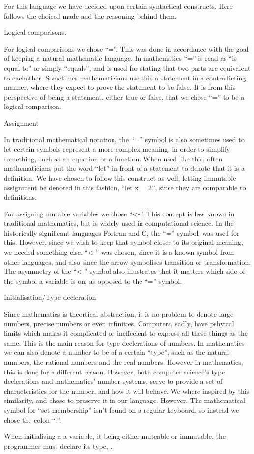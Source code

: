 For this language we have decided upon certain syntactical constructs. Here follows the choiced made and the reasoning behind them.

%

Logical comparisons.

For logical comparisons we chose \enquote{=}. This was done in accordance with the goal of keeping a natural mathematic language. In mathematics \enquote{=} is read as \enquote{is equal to} or simply \enquote{equals}, and is used for stating that two parts are equivalent to eachother. Sometimes mathematicians use this a statement in a contradicting manner, where they expect to prove the statement to be false. It is from this perspective of being a statement, either true or false, that we chose \enquote{=} to be a logical comparison.

Assignment

In traditional mathematical notation, the \enquote{=} symbol is also sometimes used to let certain symbols represent a more complex meaning, in order to simplify something, such as an equation or a function. When used like this, often mathematicians put the word \enquote{let} in front of a statement to denote that it is a definition. We have chosen to follow this construct as well, letting immutable assignment be denoted in this fashion, \enquote{let x = 2}, since they are comparable to definitions.

For assigning mutable variables we chose \enquote{<-}. This concept is less known in traditional mathematics, but is widely used in computational science. In the historically significant languages Fortran and C, the \enquote{=} symbol, was used for this. However, since we wish to keep that symbol closer to its original meaning, we needed something else. \enquote{<-} was chosen, since it is a known symbol from other languages, and also since the arrow symbolises transition or transformation. The asymmetry of the \enquote{<-} symbol also illustrates that it matters which side of the symbol a variable is on, as opposed to the \enquote{=} symbol.


Initialisation/Type decleration

Since mathematics is theortical abstraction, it is no problem to denote large numbers, precise numbers or even infinities. Computers, sadly, have pshyical limits which makes it complicated or ineffecient to express all these things as the same. This is the main reason for type declerations of numbers. In mathematics we can also denote a number to be of a certain \enquote{type}, such as the natural numbers, the rational numbers and the real numbers. However in mathematics, this is done for a different reason. However, both computer science's type declerations and mathematics' number systems, serve to provide a set of characteristics for the number, and how it will behave. We where inspired by this similarity, and chose to preserve it in our language. However, The mathematical symbol for \enquote{set membership} isn't found on a regular keyboard, so instead we chose the colon \enquote{:}.

When initialising a a variable, it being either muteable or immutable, the programmer must declare its type, ..